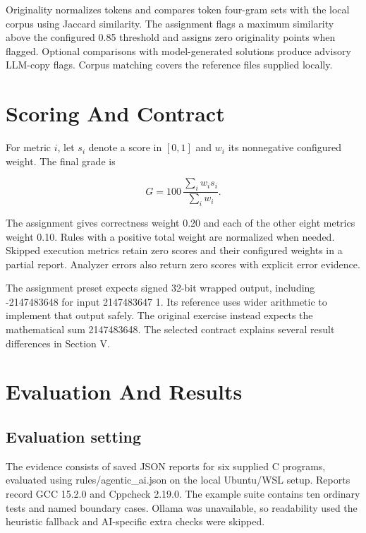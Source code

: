 \documentclass[conference]{IEEEtran}
\begin{document}
Originality normalizes tokens and compares token four-gram sets with the local corpus using Jaccard similarity. The assignment flags a maximum similarity above the configured 0.85 threshold and assigns zero originality points when flagged. Optional comparisons with model-generated solutions produce advisory LLM-copy flags. Corpus matching covers the reference files supplied locally.


\section{Scoring And Contract}

For metric $i$, let $s_i$ denote a score in $[0,1]$ and $w_i$ its nonnegative configured weight. The final grade is

\begin{equation}G=100\,\frac{\sum_i w_i s_i}{\sum_i w_i}.\label{eq:grade}\end{equation}

The assignment gives correctness weight 0.20 and each of the other eight metrics weight 0.10. Rules with a positive total weight are normalized when needed. Skipped execution metrics retain zero scores and their configured weights in a partial report. Analyzer errors also return zero scores with explicit error evidence.


The assignment preset expects signed 32-bit wrapped output, including -2147483648 for input 2147483647 1. Its reference uses wider arithmetic to implement that output safely. The original exercise instead expects the mathematical sum 2147483648. The selected contract explains several result differences in Section V.


\newpage

\section{Evaluation And Results}

\subsection{Evaluation setting}

The evidence consists of saved JSON reports for six supplied C programs, evaluated using rules/agentic\_ai.json on the local Ubuntu/WSL setup. Reports record GCC 15.2.0 and Cppcheck 2.19.0. The example suite contains ten ordinary tests and named boundary cases. Ollama was unavailable, so readability used the heuristic fallback and AI-specific extra checks were skipped.
\end{document}
